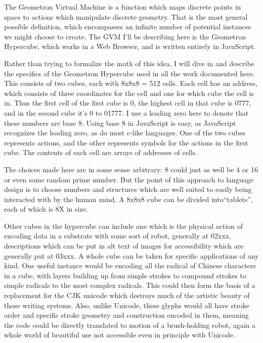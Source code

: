 \documentclass[11pt]{article}
\begin{document}
    The Geometron Virtual Machine is a function which maps discrete points in space to actions which manipulate discrete geometry.  That is the most general possible definition, which encompasses an infinite number of potential instances we might choose to create.  The GVM I'll be describing here is the Geometron Hypercube, which works in a Web Browser, and is written entirely in JavaScript.   


    Rather than trying to formalize the math of this idea, I will dive in and describe the specifics of the Geometron Hypercube used in all the work documented here.  This consists of two cubes, each with 8x8x8 = 512 cells.  Each cell has an address, which consists of three coordinates for the cell and one for which cube the cell is in.  Thus the first cell of the first cube is 0, the highest cell in that cube is 0777, and in the second cube it's 0 to 01777.  I use a leading zero here to denote that these numbers are base 8.  Using base 8 in JavaScript is easy, as JavaScript recognizes the leading zero, as do most c-like languages.   One of the two cubes represents actions, and the other represents symbols for the actions in the first cube.  The contents of each cell are arrays of addresses of cells.  

    The choices made here are in some sense arbitrary: 8 could just as well be 4 or 16 or even some random prime number.  But the point of this approach to language design is to choose numbers and structures which are well suited to easily being interacted with by the human mind.  A 8x8x8 cube can be divided into``tablets'', each of which is 8X in size.  

    Other cubes in the hypercube can include one which is the physical action of encoding data in a substrate with some sort of robot, generally at 02xxx, descriptions which can be put in alt text of images for accessibility which are generally put at 03xxx.  A whole cube can be taken for specific applications of any kind.  One useful instance would be encoding all the radical of Chinese characters in a cube, with layers building up from simple strokes to compound strokes to simple radicals to the most complex radicals.  This could then form the basis of a replacement for the CJK unicode which destroys much of the artistic beauty of those writing systems.  Also, unlike Unicode, these glyphs would all have stroke order and specific stroke geometry and construction encoded in them, meaning the code could be directly translated to motion of a brush-holding robot, again a whole world of beautiful use not accessible even in principle with Unicode.
\end{document}
